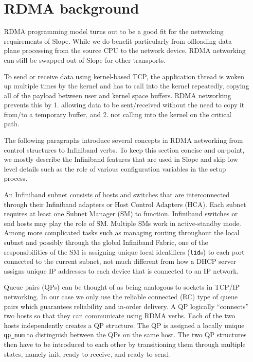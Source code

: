 \section{RDMA background}
RDMA programming model turns out to be a good fit for the networking
requirements of Slope. While we do benefit particularly from
offloading data plane processing from the source CPU to the network device,
RDMA networking can still be swapped out of Slope for other transports.

To send or receive data using kernel-based TCP, the application thread
is woken up multiple times by the kernel and has to call into the kernel
repeatedly, copying all of the payload between user and kernel space buffers.
RDMA networking prevents this by 1. allowing data to be sent/received without
the need to copy it from/to a temporary buffer, and 2. not calling into the
kernel on the critical path.

The following paragraphs introduce several concepts in RDMA
networking from control structures to Infiniband verbs. To keep this section
concise and on-point, we mostly describe the Infiniband features that are used
in Slope and skip low level details such as the role of various configuration
variables in the setup process.

An Infiniband subnet consists of hosts and switches that are interconnected
through their Infiniband adapters or Host Control Adapters (HCA).
Each subnet requires at least one Subnet Manager (SM) to function.
Infiniband switches or end hosts may play the role of SM. Multiple SMs
work in active-standby mode. Among more complicated tasks such as managing
routing throughout the local subnet and possibly through the global Infiniband
Fabric, one of the responsibilities of the SM is assigning unique local
identifiers (\texttt{lid}s) to each port connected to the current subnet, not much
different from how a DHCP server assigns unique IP addresses to each device
that is connected to an IP network.

Queue pairs (QPs) can be thought of as being analogous to sockets in TCP/IP
networking. In our case we only use the reliable connected (RC) type of queue
pairs which guarantees reliability and in-order delivery.
A QP logically ``connects'' two hosts so that they can communicate using
RDMA verbs. Each of the two hosts independently creates a QP structure. The
QP is assigned a locally unique \texttt{qp\_num} to distinguish between the
QPs on the same host. The two QP structures then have to be introduced to
each other by transitioning them through multiple states, namely init, ready to
receive, and ready to send.

